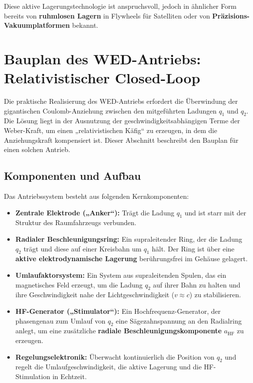 \documentclass[11pt, a4paper]{article}
\begin{document}
Diese aktive Lagerungstechnologie ist anspruchsvoll, jedoch in ähnlicher Form bereits von \textbf{ruhmlosen Lagern} in Flywheels für Satelliten oder von
\textbf{Präzisions-Vakuumplatformen} bekannt.

\section{Bauplan des WED-Antriebs: Relativistischer Closed-Loop}

Die praktische Realisierung des WED-Antriebs erfordert die Überwindung der gigantischen Coulomb-Anziehung zwischen den mitgeführten Ladungen $q_1$ und $q_2$. Die Lösung liegt in der Ausnutzung der geschwindigkeitsabhängigen Terme der Weber-Kraft, um einen „relativistischen Käfig“ zu erzeugen, in dem die Anziehungskraft kompensiert ist. Dieser Abschnitt beschreibt den Bauplan für einen solchen Antrieb.

\subsection{Komponenten und Aufbau}

Das Antriebssystem besteht aus folgenden Kernkomponenten:

\begin{itemize}
    \item \textbf{Zentrale Elektrode („Anker“):} Trägt die Ladung $q_1$ und ist starr mit der Struktur des Raumfahrzeugs verbunden.
    \item \textbf{Radialer Beschleunigungsring:} Ein supraleitender Ring, der die Ladung $q_2$ trägt und diese auf einer Kreisbahn um $q_1$ hält. Der Ring ist über eine \textbf{aktive elektrodynamische Lagerung} berührungsfrei im Gehäuse gelagert.
    \item \textbf{Umlaufaktorsystem:} Ein System aus supraleitenden Spulen, das ein magnetisches Feld erzeugt, um die Ladung $q_2$ auf ihrer Bahn zu halten und ihre Geschwindigkeit nahe der Lichtgeschwindigkeit ($v \approx c$) zu stabilisieren.
    \item \textbf{HF-Generator („Stimulator“):} Ein Hochfrequenz-Generator, der phasengenau zum Umlauf von $q_2$ eine Sägezahnspannung an den Radialring anlegt, um eine zusätzliche \textbf{radiale Beschleunigungskomponente} $a_{\text{HF}}$ zu erzeugen.
    \item \textbf{Regelungselektronik:} Überwacht kontinuierlich die Position von $q_2$ und regelt die Umlaufgeschwindigkeit, die aktive Lagerung und die HF-Stimulation in Echtzeit.
\end{itemize}
\end{document}
